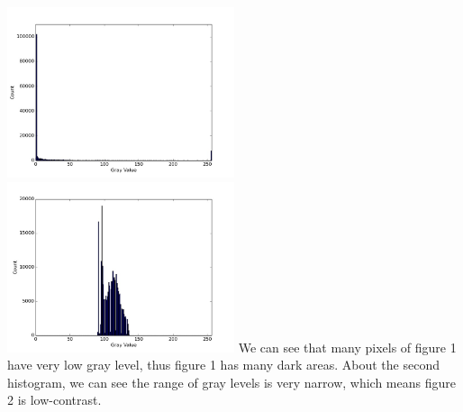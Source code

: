 \documentclass{article}
\begin{document}
\includegraphics[width=0.5\textwidth]{../data/histogram_Fig1.jpg}
\includegraphics[width=0.5\textwidth]{../data/histogram_Fig2.jpg}
We can see that many pixels of figure 1 have very low gray level, thus figure 1 has many dark areas. About the second histogram, we can see the range of gray levels is very narrow, which means figure 2 is low-contrast.
\end{document}
